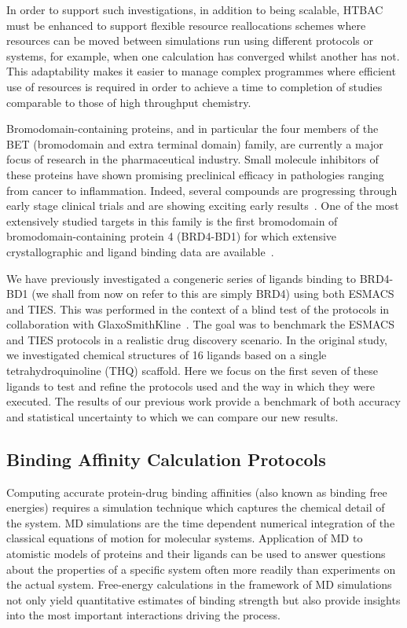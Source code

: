 \documentclass[conference]{IEEEtran}
\begin{document}
In order to support such investigations, in addition to being scalable, HTBAC 
must be enhanced to support flexible resource reallocations schemes where 
resources can be moved between simulations run using different protocols or 
systems, for example, when one calculation has converged whilst another has not. 
This adaptability makes it easier to manage complex programmes where efficient 
use of resources is required in order to achieve a time to completion of studies 
comparable to those of high throughput chemistry. 

Bromodomain-containing proteins, and in particular the four members of the BET
(bromodomain and extra terminal domain) family, are currently a major focus of
research in the pharmaceutical industry. 
Small molecule inhibitors of these
proteins have shown promising preclinical efficacy in pathologies ranging from
cancer to inflammation. 
Indeed, several compounds are progressing through
early stage clinical trials and are showing exciting early
results~\cite{Theodoulou2016}. 
One of the most extensively studied targets in
this family is the first bromodomain of bromodomain-containing protein 4
(BRD4-BD1) for which extensive crystallographic and ligand binding data are
available~\cite{Bamborough2012}.

We have previously investigated a congeneric series of ligands binding to
BRD4-BD1 (we shall from now on refer to this are simply BRD4) using both
ESMACS and TIES. 
This was performed in the context of a blind test of the
protocols in collaboration with GlaxoSmithKline~\cite{Wan2017brd4}. 
The goal was to benchmark the ESMACS and TIES protocols in a realistic drug 
discovery scenario. 
In the original study, we investigated chemical structures of 16 ligands based 
on a single tetrahydroquinoline (THQ) scaffold. %
Here we focus on the first seven of these ligands to test
and refine the protocols used and the way in which they were executed. The
results of our previous work provide a benchmark of both accuracy and
statistical uncertainty to which we can compare our new results.

\subsection{Binding Affinity Calculation Protocols}\label{sec:bac}

Computing accurate protein-drug binding affinities (also known as binding free energies) requires a simulation technique which captures the chemical detail of the system. 
MD simulations are the time dependent numerical integration of the classical equations of motion for molecular systems. 
Application of MD to atomistic models of proteins and their ligands can be used to answer questions about the properties of a specific system often more readily than experiments on the actual system. 
Free-energy calculations in the framework of MD simulations not only yield quantitative estimates of binding strength but also provide insights into the most important interactions driving the process.
\end{document}
